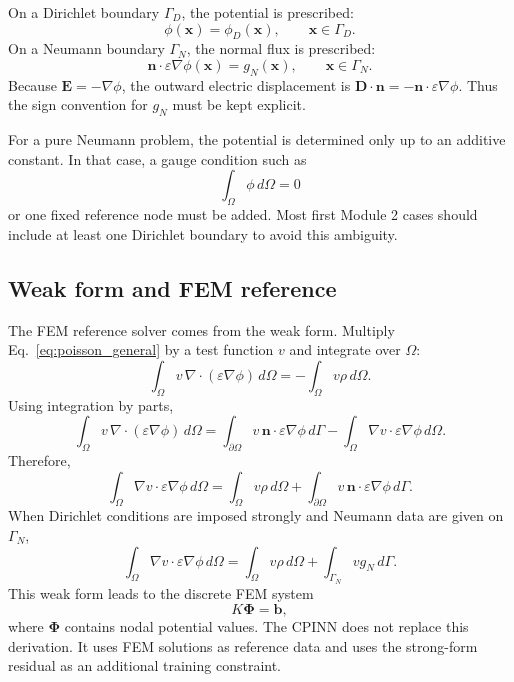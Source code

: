 \documentclass[11pt]{article}
\newcommand{\xv}{\bm{x}}
\newcommand{\Evec}{\mathbf{E}}
\newcommand{\Dvec}{\mathbf{D}}
\newcommand{\nvecb}{\mathbf{n}}
\newcommand{\Om}{\Omega}
\begin{document}
On a Dirichlet boundary $\Gamma_D$, the potential is prescribed:
\begin{equation}
\phi(\xv)=\phi_D(\xv),\qquad \xv\in\Gamma_D.
\label{eq:dirichlet_bc}
\end{equation}
On a Neumann boundary $\Gamma_N$, the normal flux is prescribed:
\begin{equation}
\nvecb\cdot\varepsilon\nabla\phi(\xv)=g_N(\xv),\qquad \xv\in\Gamma_N.
\label{eq:neumann_bc}
\end{equation}
Because $\Evec=-\nabla\phi$, the outward electric displacement is $\Dvec\cdot\nvecb=-\nvecb\cdot\varepsilon\nabla\phi$. Thus the sign convention for $g_N$ must be kept explicit.

For a pure Neumann problem, the potential is determined only up to an additive constant. In that case, a gauge condition such as
\begin{equation}
\int_{\Om}\phi\,d\Om=0
\label{eq:gauge_condition}
\end{equation}
or one fixed reference node must be added. Most first Module 2 cases should include at least one Dirichlet boundary to avoid this ambiguity.

\subsection{Weak form and FEM reference}

The FEM reference solver comes from the weak form. Multiply Eq.~\eqref{eq:poisson_general} by a test function $v$ and integrate over $\Om$:
\begin{equation}
\int_{\Om} v\,\nabla\cdot(\varepsilon\nabla\phi)\,d\Om
= -\int_{\Om}v\rho\,d\Om.
\end{equation}
Using integration by parts,
\begin{equation}
\int_{\Om} v\,\nabla\cdot(\varepsilon\nabla\phi)\,d\Om
=\int_{\partial\Om} v\,\nvecb\cdot\varepsilon\nabla\phi\,d\Gamma
-\int_{\Om}\nabla v\cdot\varepsilon\nabla\phi\,d\Om.
\end{equation}
Therefore,
\begin{equation}
\int_{\Om}\nabla v\cdot\varepsilon\nabla\phi\,d\Om
=\int_{\Om}v\rho\,d\Om
+\int_{\partial\Om} v\,\nvecb\cdot\varepsilon\nabla\phi\,d\Gamma.
\label{eq:weak_form_general}
\end{equation}
When Dirichlet conditions are imposed strongly and Neumann data are given on $\Gamma_N$,
\begin{equation}
\int_{\Om}\nabla v\cdot\varepsilon\nabla\phi\,d\Om
=\int_{\Om}v\rho\,d\Om
+\int_{\Gamma_N} v g_N\,d\Gamma.
\label{eq:weak_form_neumann}
\end{equation}
This weak form leads to the discrete FEM system
\begin{equation}
K\bm{\Phi}=\bm{b},
\label{eq:fem_linear_system}
\end{equation}
where $\bm{\Phi}$ contains nodal potential values. The CPINN does not replace this derivation. It uses FEM solutions as reference data and uses the strong-form residual as an additional training constraint.
\end{document}
